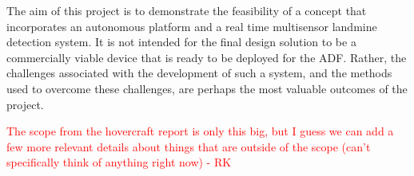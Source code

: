 \documentclass[main.tex]{subfiles}
\begin{document}
The aim of this project is to demonstrate the feasibility of a concept that incorporates an autonomous platform and a real time multisensor landmine detection system. It is not intended for the final design solution to be a commercially viable device that is ready to be deployed for the ADF. Rather, the challenges associated with the development of such a system, and the methods used to overcome these challenges, are perhaps the most valuable outcomes of the project. 

\textcolor{red}{The scope from the hovercraft report is only this big, but I guess we can add a few more relevant details about things that are outside of the scope (can't specifically think of anything right now) - RK}
\end{document}
